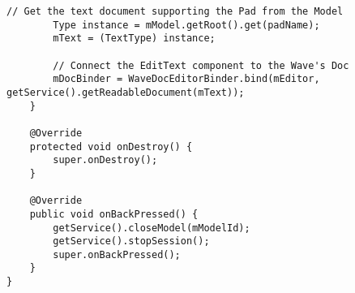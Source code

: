 \begin{lstlisting}[frame=single]
        // Get the text document supporting the Pad from the Model
        Type instance = mModel.getRoot().get(padName);
        mText = (TextType) instance;

        // Connect the EditText component to the Wave's Doc
        mDocBinder = WaveDocEditorBinder.bind(mEditor, getService().getReadableDocument(mText));
    }

    @Override
    protected void onDestroy() {
        super.onDestroy();
    }

    @Override
    public void onBackPressed() {
        getService().closeModel(mModelId);
        getService().stopSession();
        super.onBackPressed();
    }
}  
	  \end{lstlisting}


\rhead{}
\renewcommand{\headrulewidth}{0pt}